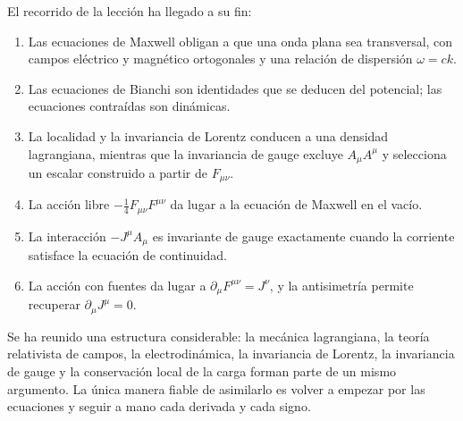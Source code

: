 El recorrido de la lección ha llegado a su fin:
\begin{enumerate}
\item Las ecuaciones de Maxwell obligan a que una onda plana sea transversal, con campos eléctrico y magnético ortogonales y una relación de dispersión \(\omega=ck\).
\item Las ecuaciones de Bianchi son identidades que se deducen del potencial; las ecuaciones contraídas son dinámicas.
\item La localidad y la invariancia de Lorentz conducen a una densidad lagrangiana, mientras que la invariancia de gauge excluye \(A_\mu A^\mu\) y selecciona un escalar construido a partir de \(F_{\mu\nu}\).
\item La acción libre \(-\tfrac14F_{\mu\nu}F^{\mu\nu}\) da lugar a la ecuación de Maxwell en el vacío.
\item La interacción \(-J^\mu A_\mu\) es invariante de gauge exactamente cuando la corriente satisface la ecuación de continuidad.
\item La acción con fuentes da lugar a \(\partial_\mu F^{\mu\nu}=J^\nu\), y la antisimetría permite recuperar \(\partial_\mu J^\mu=0\).
\end{enumerate}

Se ha reunido una estructura considerable: la mecánica lagrangiana, la teoría relativista de campos, la electrodinámica, la invariancia de Lorentz, la invariancia de gauge y la conservación local de la carga forman parte de un mismo argumento. La única manera fiable de asimilarlo es volver a empezar por las ecuaciones y seguir a mano cada derivada y cada signo.